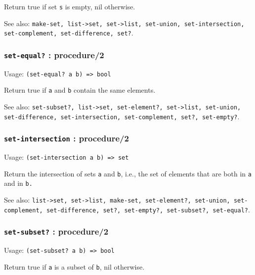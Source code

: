 \documentclass[
]{article}
\newcommand{\passthrough}[1]{#1}
\begin{document}
Return true if set \passthrough{\lstinline!s!} is empty, nil otherwise.

See also:
\passthrough{\lstinline!make-set, list->set, set->list, set-union, set-intersection, set-complement, set-difference, set?!}.

\hypertarget{set-equal-procedure2}{%
\subsubsection{\texorpdfstring{\texttt{set-equal?} :
procedure/2}{set-equal? : procedure/2}}\label{set-equal-procedure2}}

Usage: \passthrough{\lstinline!(set-equal? a b) => bool!}

Return true if \passthrough{\lstinline!a!} and
\passthrough{\lstinline!b!} contain the same elements.

See also:
\passthrough{\lstinline!set-subset?, list->set, set-element?, set->list, set-union, set-difference, set-intersection, set-complement, set?, set-empty?!}.

\hypertarget{set-intersection-procedure2}{%
\subsubsection{\texorpdfstring{\texttt{set-intersection} :
procedure/2}{set-intersection : procedure/2}}\label{set-intersection-procedure2}}

Usage: \passthrough{\lstinline!(set-intersection a b) => set!}

Return the intersection of sets \passthrough{\lstinline!a!} and
\passthrough{\lstinline!b!}, i.e., the set of elements that are both in
\passthrough{\lstinline!a!} and in \passthrough{\lstinline!b.!}

See also:
\passthrough{\lstinline!list->set, set->list, make-set, set-element?, set-union, set-complement, set-difference, set?, set-empty?, set-subset?, set-equal?!}.

\hypertarget{set-subset-procedure2}{%
\subsubsection{\texorpdfstring{\texttt{set-subset?} :
procedure/2}{set-subset? : procedure/2}}\label{set-subset-procedure2}}

Usage: \passthrough{\lstinline!(set-subset? a b) => bool!}

Return true if \passthrough{\lstinline!a!} is a subset of
\passthrough{\lstinline!b!}, nil otherwise.
\end{document}

